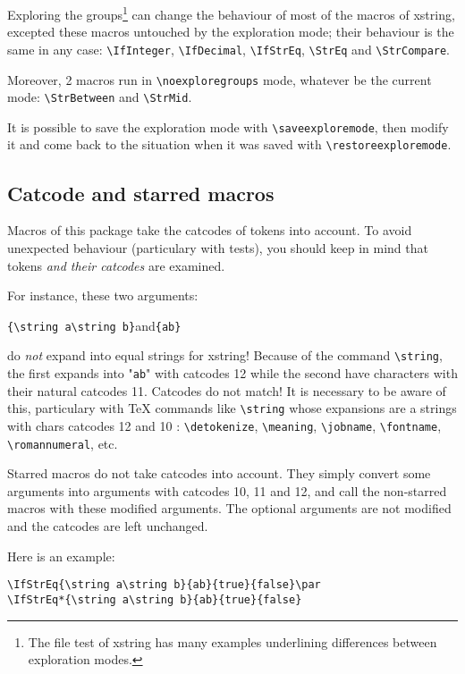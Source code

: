 \documentclass[a4paper,10pt]{article}
\newcommand\Xstring{\textsf{xstring}\xspace}
\newcommand\styleexercice{\footnotesize}
\newcommand\verbinline{\lstinline[basicstyle=\normalsize\ttfamily]}
\begin{document}
Exploring the groups\footnote{The file test of \Xstring has many examples underlining differences between exploration modes.} can change the behaviour of most of the macros of \Xstring, excepted these macros untouched by the exploration mode; their behaviour is the same in any case: \verbinline|\IfInteger|, \verbinline|\IfDecimal|, \verbinline|\IfStrEq|, \verbinline|\StrEq| and \verbinline|\StrCompare|.

Moreover, 2 macros run in \verbinline|\noexploregroups| mode, whatever be the current mode: \verbinline|\StrBetween| and \verbinline|\StrMid|.\medskip

It is possible to save the exploration mode with \verbinline|\saveexploremode|, then modify it and come back to the situation when it was saved with \verbinline|\restoreexploremode|.

\subsection{Catcode and starred macros}
\label{macrosetoilees}
Macros of this package take the catcodes of tokens into account. To avoid unexpected behaviour (particulary with tests), you should keep in mind that tokens \emph{and their catcodes} are examined.\medskip

For instance, these two arguments:\par\medskip
\hfil\verbinline|{\string a\string b}|\qquad and\qquad\verb|{ab}|\hfil{}\par\smallskip
do \emph{not} expand into equal strings for xstring! Because of the command \verbinline|\string|, the first expands into "\verb|ab|" with catcodes 12 while the second have characters with their natural catcodes 11. Catcodes do not match! It is necessary to be aware of this, particulary with \TeX{} commands like \verbinline|\string| whose expansions are a strings with chars catcodes 12 and 10 : \verbinline|\detokenize|, \verbinline|\meaning|, \verbinline|\jobname|, \verbinline|\fontname|, \verbinline|\romannumeral|, etc.\medskip

Starred macros do not take catcodes into account. They simply convert some arguments into arguments with catcodes 10, 11 and 12, and call the non-starred macros with these modified arguments. The optional arguments are not modified and the catcodes are left unchanged.\medskip

Here is an example:\par\nobreak\smallskip
\begin{minipage}[c]{0.65\linewidth}
\begin{lstlisting}
\IfStrEq{\string a\string b}{ab}{true}{false}\par
\IfStrEq*{\string a\string b}{ab}{true}{false}
\end{lstlisting}%
\end{minipage}\hfill
\begin{minipage}[c]{0.35\linewidth}
	\styleexercice
	\par
\end{minipage}%
\smallskip
\end{document}

